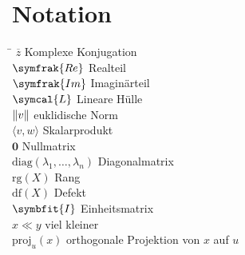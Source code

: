 \chapter*{Notation}
\begin{tabbing}
    \hspace{4cm} \= \kill
    \(\overline{z}\) \>  Komplexe Konjugation \\
    \(\symfrak{Re}\) \>  Realteil \\
    \(\symfrak{Im}\) \>  Imaginärteil \\
    \(\symcal{L}\)   \>  Lineare Hülle \\ 
    \(\lVert v\rVert\)     \>  euklidische Norm \\ 
    \(\langle v,w \rangle\) \> Skalarprodukt \\
    \(\symbf{0}\) \> Nullmatrix \\
    \(\text{diag}(\lambda_1,\ldots,\lambda_n)\) \> Diagonalmatrix \\
    \(\text{rg}(X)\) \> Rang \\
    \(\text{df}(X)\) \> Defekt \\
    \(\symbfit{I}\) \> Einheitsmatrix \\
    \(x \ll y\) \> viel kleiner \\
    \(\text{proj}_{u}(x)\) \> orthogonale Projektion von \(x\) auf \(u\) \\
\end{tabbing}
